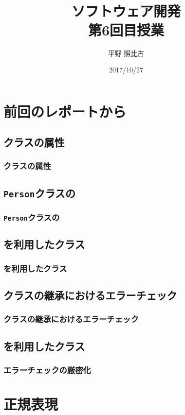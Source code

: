 %
%

\title{ソフトウェア開発\\第6回目授業}
\author{平野 照比古}
\institute{}
\date{2017/10/27}

\frame{\maketitle}
\section{前回のレポートから}
\subsection{クラスの属性}
\begin{frame}
 \frametitle{クラスの属性}
\end{frame}
\subsection{\texttt{Person}クラスの}
\begin{frame}
 \frametitle{\texttt{Person}クラスの}
\end{frame}
\subsection{を利用したクラス}
\begin{frame}
 \frametitle{を利用したクラス}
\end{frame}
\subsection{クラスの継承におけるエラーチェック}
\begin{frame}
 \frametitle{クラスの継承におけるエラーチェック}
\end{frame}
\subsection{を利用したクラス}
\begin{frame}
 \frametitle{エラーチェックの厳密化}
\end{frame}
 \section{正規表現}
